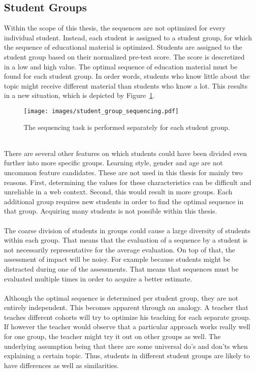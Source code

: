 \subsection{Student Groups}
\label{sec:task_student_groups}
Within the scope of this thesis, the sequences are not optimized for every
individual student. Instead, each student is assigned to a student group, for
which the sequence of educational material is optimized. Students are assigned
to the student group based on their normalized pre-test score. The score is
descretized in a low and high value.  The optimal sequence of education
material must be found for each student group. In order words, students
who know little about the topic might receive different material than students
who know a lot. This results in a new situation, which is depicted by
Figure~\ref{fig:student_group_sequencing}.\\
\begin{figure}[ht]
	\centering
	\texttt{[image: images/student\_group\_sequencing.pdf]}
	\caption[Educational context of the task with student groups]{The
	sequencing task is performed separately for each student group.}
	\label{fig:student_group_sequencing}
\end{figure}\\
\noindent
There are several other features on which students could have been
divided even further into more specific groups. Learning style, gender and age
are not uncommon feature candidates. These are not used in this thesis for
mainly two reasons. First, determining the values for these characteristics can
be difficult and unreliable in a web context. Second, this would result in more
groups. Each additional group requires new students in order to find the
optimal sequence in that group. Acquiring many students is not possible within
this thesis.\\\\
\noindent
The coarse division of students in groups could cause a large diversity of
students within each group. That means that the evaluation of a sequence by a
student is not necessarily representative for the average evaluation. On top of
that, the assessment of impact will be noisy. For example because students
might be distracted during one of the assessments. That means that sequences
must be evaluated multiple times in order to acquire a better estimate.\\\\
\noindent
Although the optimal sequence is determined per student group, they are not
entirely independent. This becomes apparent through an analogy. A teacher that
teaches different cohorts will try to optimize his teaching for each
separate group. If however the teacher would observe that a particular approach
works really well for one group, the teacher might try it out on other groups
as well. The underlying assumption being that there are some universal do's and
don'ts when explaining a certain topic. Thus, students in different student
groups are likely to have differences as well as similarities.

